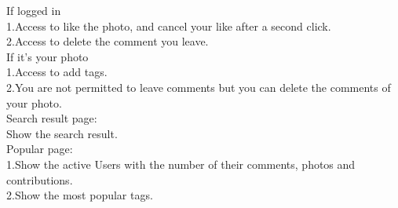 \documentclass[11pt, oneside]{article}   	%
\begin{document}
If logged in\\[0.1cm]
1.Access to like the photo, and cancel your like after a second click.\\
2.Access to delete the comment you leave.\\
If it's your photo\\[0.1cm]
1.Access to add tags.\\
2.You are not permitted to leave comments but you can delete the comments of your photo.\\[0.3cm]
Search result page:\\[0.1cm]
Show the search result.\\[0.3cm]
Popular page:\\[0.1cm]
1.Show the active Users with the number of their comments, photos and contributions.\\
2.Show the most popular tags.\\ 
\end{document}

